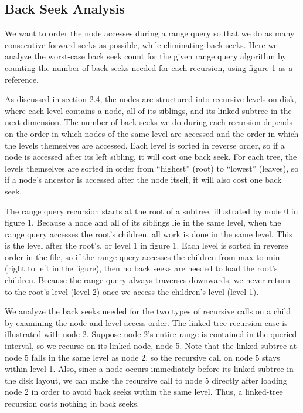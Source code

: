 \documentclass[11pt, oneside]{article}
\begin{document}
\subsection{Back Seek Analysis}

We want to order the node accesses during a range query so that we do as many
consecutive forward seeks as possible, while eliminating back seeks. Here we
analyze the worst-case back seek count for the given range query algorithm by
counting the number of back seeks needed for each recursion, using figure 1 as a
reference. 

As discussed in section 2.4, the nodes are structured into recursive levels on
disk, where each level contains a node, all of its siblings, and its linked
subtree in the next dimension. The number of back seeks we do during each
recursion depends on the order in which nodes of the same level are accessed and
the order in which the levels themselves are accessed. Each level is sorted in
reverse order, so if a node is accessed after its left sibling, it will cost one
back seek. For each tree, the levels themselves are sorted in order from
``highest'' (root) to ``lowest'' (leaves), so if a node's ancestor is accessed
after the node itself, it will also cost one back seek. 

The range query recursion starts at the root of a subtree, illustrated by node
0 in figure 1. Because a node and all of its siblings lie in the same level,
when the range query accesses the root's children, all work is done in the same
level. This is the level after the root's, or level 1 in figure 1. Each level
is sorted in reverse order in the file, so if the range query accesses the
children from max to min (right to left in the figure), then no back seeks are
needed to load the root's children. Because the range query always traverses
downwards, we never return to the root's level (level 2) once we access the
children's level (level 1). 

We analyze the back seeks needed for the two types of recursive calls on a child
by examining the node and level access order. The linked-tree recursion case is
illustrated with node 2. Suppose node 2's entire range is contained in the queried interval, so we recurse on its linked node, node 5. Note that the linked
subtree at node 5 falls in the same level as node 2, so the recursive call on
node 5 stays within level 1. Also, since a node occurs immediately before its
linked subtree in the disk layout, we can make the recursive call to node 5
directly after loading node 2 in order to avoid back seeks within the same
level. Thus, a linked-tree recursion costs nothing in back seeks.
\end{document}
